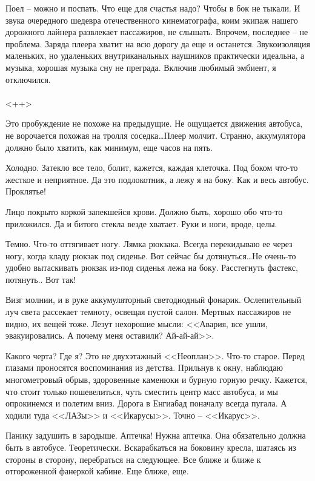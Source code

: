 \documentclass[a4paper]{book}
\begin{document}
Поел -- можно и поспать. Что еще для счастья надо? Чтобы в бок не тыкали. И звука очередного шедевра отечественного кинематографа, коим экипаж нашего дорожного лайнера развлекает пассажиров, не слышать. Впрочем, последнее -- не проблема. Заряда плеера хватит на всю дорогу да еще и останется. Звукоизоляция маленьких, но удаленьких внутриканальных наушников практически идеальна, а музыка, хорошая музыка сну не преграда. Включив любимый эмбиент, я отключился.

\paragraph{}<++>

Это пробуждение не похоже на предыдущие. Не ощущается движения автобуса, не
ворочается похожая на тролля соседка\ldots Плеер молчит. Странно, аккумулятора должно было хватить, как минимум, еще часов на пять. 

Холодно. Затекло все тело, болит, кажется, каждая клеточка. Под боком что-то жесткое и неприятное. Да это подлокотник, а лежу я на боку. Как и весь автобус. Проклятье!

Лицо покрыто коркой запекшейся крови. Должно быть, хорошо обо что-то приложился. Да и битого стекла везде хватает. Руки и ноги, вроде, целы.

Темно. Что-то оттягивает ногу. Лямка рюкзака. Всегда перекидываю ее через ногу, когда кладу рюкзак под сиденье. Вот сейчас бы дотянуться\ldots Не очень-то удобно вытаскивать рюкзак из-под сиденья лежа на боку. Расстегнуть фастекс, потянуть.. Вот так!

Визг молнии, и в руке аккумуляторный светодиодный фонарик. Ослепительный луч света рассекает темноту, освещая пустой салон. Мертвых пассажиров не видно, их вещей тоже. Лезут нехорошие мысли: <<Авария, все ушли, эвакуировались. А почему меня оставили? Ай-ай-ай>>.

Какого черта? Где я? Это не двухэтажный <<Неоплан>>. Что-то старое. Перед глазами проносятся воспоминания из детства. Прильнув к окну, наблюдаю многометровый обрыв, здоровенные каменюки и бурную горную речку. Кажется, что стоит только пошевелиться, чуть сместить центр масс автобуса, и мы опрокинемся и полетим вниз. Дорога в Енгиабад поначалу всегда пугала. А ходили туда <<ЛАЗы>> и <<Икарусы>>. Точно -- <<Икарус>>.

Панику задушить в зародыше. Аптечка! Нужна аптечка. Она обязательно должна быть в автобусе. Теоретически. Вскарабкаться на боковину кресла, шатаясь из стороны в сторону, перебраться на следующее. Все ближе и ближе к отгороженной фанеркой кабине. Еще ближе, еще. 
\end{document}
